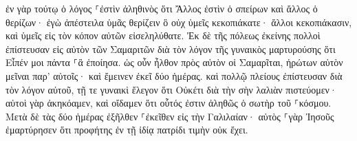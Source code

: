 \documentclass{openreader}
\begin{document}
ἐν γὰρ τούτῳ ὁ λόγος ⸀ἐστὶν ἀληθινὸς ὅτι Ἄλλος ἐστὶν ὁ σπείρων καὶ ἄλλος ὁ θερίζων· 
ἐγὼ ἀπέστειλα ὑμᾶς θερίζειν ὃ οὐχ ὑμεῖς κεκοπιάκατε· ἄλλοι κεκοπιάκασιν, καὶ ὑμεῖς εἰς τὸν κόπον αὐτῶν εἰσεληλύθατε. 
Ἐκ δὲ τῆς πόλεως ἐκείνης πολλοὶ ἐπίστευσαν εἰς αὐτὸν τῶν Σαμαριτῶν διὰ τὸν λόγον τῆς γυναικὸς μαρτυρούσης ὅτι Εἶπέν μοι πάντα ⸀ἃ ἐποίησα. 
ὡς οὖν ἦλθον πρὸς αὐτὸν οἱ Σαμαρῖται, ἠρώτων αὐτὸν μεῖναι παρ’ αὐτοῖς· καὶ ἔμεινεν ἐκεῖ δύο ἡμέρας. 
καὶ πολλῷ πλείους ἐπίστευσαν διὰ τὸν λόγον αὐτοῦ, 
τῇ τε γυναικὶ ἔλεγον ὅτι Οὐκέτι διὰ τὴν σὴν λαλιὰν πιστεύομεν· αὐτοὶ γὰρ ἀκηκόαμεν, καὶ οἴδαμεν ὅτι οὗτός ἐστιν ἀληθῶς ὁ σωτὴρ τοῦ ⸀κόσμου. 
Μετὰ δὲ τὰς δύο ἡμέρας ἐξῆλθεν ⸀ἐκεῖθεν εἰς τὴν Γαλιλαίαν· 
αὐτὸς ⸀γὰρ Ἰησοῦς ἐμαρτύρησεν ὅτι προφήτης ἐν τῇ ἰδίᾳ πατρίδι τιμὴν οὐκ ἔχει. 
\end{document}
